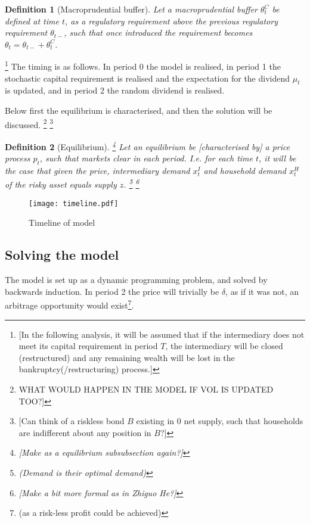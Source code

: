 \documentclass[11pt]{article}
\newtheorem{definition}{Definition}%
\begin{document}
\begin{definition}[Macroprudential buffer]
Let a macroprudential buffer $\theta^C_t$ be defined at time $t$, as a regulatory requirement above the previous regulatory requirement $\theta_{t-}$, such that once introduced the requirement becomes $\theta_t = \theta_{t-} + \theta^C_t$.
\end{definition}


\footnote{[In the following analysis, it will be assumed that if the intermediary does not meet its capital requirement in period $T$, the intermediary will be closed (restructured) and any remaining wealth will be lost in the bankruptcy(/restructuring) process.]} The timing is as follows. In period 0 the model is realised, in period 1  the stochastic capital requirement is realised and the expectation for the dividend $\mu_t$ is updated, and in period 2 the random dividend is realised.

Below first the equilibrium is characterised, and then the solution will be discussed.
\footnote{WHAT WOULD HAPPEN IN THE MODEL IF VOL IS UPDATED TOO?]}
\footnote{[Can think of a riskless bond $B$ existing in 0 net supply, such that households are indifferent about any position in $B$?]}


\begin{definition}[Equilibrium] \label{d_eqm}
\footnote{[Make as a equilibrium subsubsection again?]} Let an equilibrium be [characterised by] a price process $p_t$, such that markets clear in each period. I.e. for each time $t$, it will be the case that given the price, intermediary demand $x^I_t$ and household demand $x^H_t$ of the risky asset equals supply $z$. \footnote{(Demand is their optimal demand)} \footnote{[Make a bit more formal as in Zhiguo He?]}
\end{definition}



\begin{figure}[h]
\centering
\texttt{[image: timeline.pdf]}
\caption{Timeline of model}
\label{fig:timeline}
\end{figure}


\subsection*{Solving the model}
The model is set up as a dynamic programming problem, and solved by backwards induction. In period 2 the price will trivially be $\delta$, as if it was not, an arbitrage opportunity would exist\footnote{(as a risk-less profit could be achieved)}.
\end{document}
